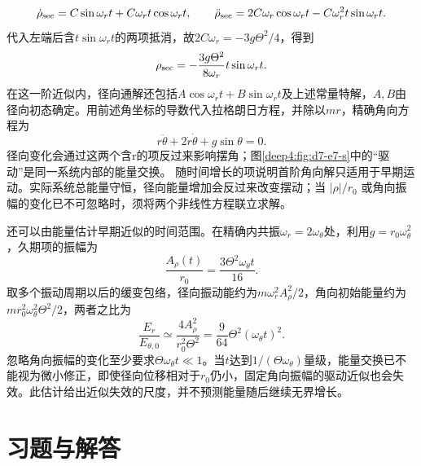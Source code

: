\begin{solution}
\[
\dot\rho_{\rm sec}=C\sin\omega_rt+C\omega_rt\cos\omega_rt,
\qquad
\ddot\rho_{\rm sec}=2C\omega_r\cos\omega_rt-C\omega_r^2t\sin\omega_rt.
\]
代入左端后含$t\sin\omega_rt$的两项抵消，故$2C\omega_r=-3g\Theta^2/4$，得到
\[
\rho_{\rm sec}=-\frac{3g\Theta^2}{8\omega_r}t\sin\omega_rt.
\]
在这一阶近似内，径向通解还包括$A\cos\omega_rt+B\sin\omega_rt$及上述常量特解，$A,B$由径向初态确定。用前述角坐标的导数代入拉格朗日方程，并除以$mr$，精确角向方程为
\[
r\ddot\theta+2\dot r\dot\theta+g\sin\theta=0.
\]
径向变化会通过这两个含r的项反过来影响摆角；图\ref{deep4:fig:d7-e7-s}中的“驱动”是同一系统内部的能量交换。
随时间增长的项说明首阶角向解只适用于早期运动。实际系统总能量守恒，径向能量增加会反过来改变摆动；当 $|\rho|/r_0$ 或角向振幅的变化已不可忽略时，须将两个非线性方程联立求解。

还可以由能量估计早期近似的时间范围。在精确内共振$\omega_r=2\omega_\theta$处，利用$g=r_0\omega_\theta^2$，久期项的振幅为
\[
 \frac{A_\rho(t)}{r_0}=\frac{3\Theta^2\omega_\theta t}{16}.
\]
取多个振动周期以后的缓变包络，径向振动能约为$m\omega_r^2A_\rho^2/2$，角向初始能量约为$mr_0^2\omega_\theta^2\Theta^2/2$，两者之比为
\[
 \frac{E_r}{E_{\theta,0}}\simeq
 \frac{4A_\rho^2}{r_0^2\Theta^2}
 =\frac9{64}\Theta^2(\omega_\theta t)^2.
\]
忽略角向振幅的变化至少要求$\Theta\omega_\theta t\ll1$。当$t$达到$1/(\Theta\omega_\theta)$量级，能量交换已不能视为微小修正，即使径向位移相对于$r_0$仍小，固定角向振幅的驱动近似也会失效。此估计给出近似失效的尺度，并不预测能量随后继续无界增长。
\end{solution}



\section{习题与解答}

